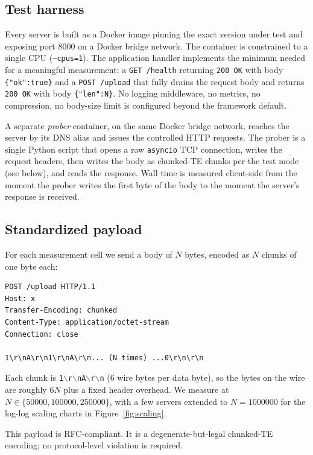 \subsection{Test harness}
\label{sec:method-harness}

Every server is built as a Docker image pinning the exact version
under test and exposing port 8000 on a Docker bridge network. The
container is constrained to a single CPU
(\texttt{--cpus=1}). The application handler implements the
minimum needed for a meaningful measurement: a \texttt{GET /health}
returning \texttt{200 OK} with body \texttt{\{"ok":true\}} and a
\texttt{POST /upload} that fully drains the request body and
returns \texttt{200 OK} with body \texttt{\{"len":N\}}. No logging
middleware, no metrics, no compression, no body-size limit is
configured beyond the framework default.

A separate \emph{prober} container, on the same Docker bridge
network, reaches the server by its DNS alias and issues the
controlled HTTP requests. The prober is a single Python script that
opens a raw \texttt{asyncio} TCP connection, writes the request
headers, then writes the body as chunked-TE chunks per the test
mode (see below), and reads the response. Wall time is measured
client-side from the moment the prober writes the first byte of
the body to the moment the server's response is received.

\subsection{Standardized payload}
\label{sec:method-payload}

For each measurement cell we send a body of $N$ bytes, encoded as
$N$ chunks of one byte each:
\begin{verbatim}
POST /upload HTTP/1.1
Host: x
Transfer-Encoding: chunked
Content-Type: application/octet-stream
Connection: close

1\r\nA\r\n1\r\nA\r\n... (N times) ...0\r\n\r\n
\end{verbatim}
Each chunk is \texttt{1$\backslash$r$\backslash$nA$\backslash$r$\backslash$n}
(6 wire bytes per data byte), so the bytes on the wire are roughly
$6N$ plus a fixed header overhead. We measure at
$N \in \{50000, 100000, 250000\}$, with a few servers extended to
$N{=}1000000$ for the log-log scaling charts in
Figure~\ref{fig:scaling}.

This payload is RFC-compliant. It is a degenerate-but-legal
chunked-TE encoding; no protocol-level violation is required.

